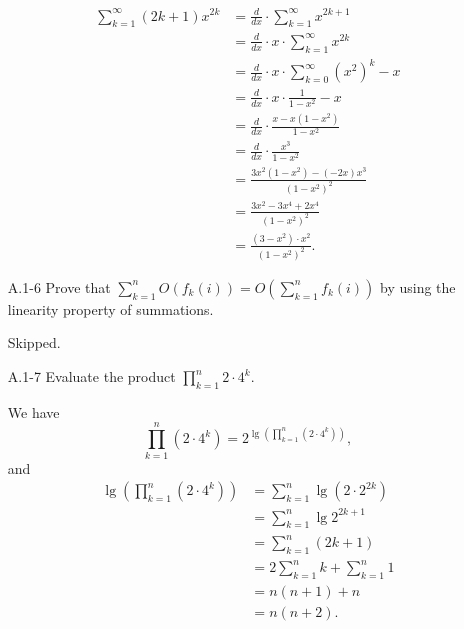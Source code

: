 \documentclass{report}
\makeatletter
\renewenvironment{framed}{%
 \def\FrameCommand##1{\hskip\@totalleftmargin
 \fboxsep=\FrameSep\fbox{##1}}%
 \MakeFramed {\advance\hsize-\width
   \@totalleftmargin\z@ \linewidth\hsize
   \@setminipage}}%
 {\par\unskip\endMakeFramed}
\makeatother
\begin{document}
\begin{enumerate}
\begin{framed}
\begin{equation*}
\begin{aligned}
  \sum_{k = 1}^{\infty} (2k + 1) x^{2k}
  &= \frac{d}{dx} \cdot \sum_{k = 1}^{\infty} x^{2k + 1}\\
  &= \frac{d}{dx} \cdot x \cdot \sum_{k = 1}^{\infty} x^{2k}\\
  &= \frac{d}{dx} \cdot x \cdot \sum_{k = 0}^{\infty} (x^2)^k - x\\
  &= \frac{d}{dx} \cdot x \cdot \frac{1}{1 - x^2} - x\\
  &= \frac{d}{dx} \cdot \frac{x - x (1 - x^2)}{1 - x^2}\\
  &= \frac{d}{dx} \cdot \frac{x^3}{1 - x^2}\\
  &= \frac{3 x^2 (1 - x^2) - (-2x) x^3}{(1 - x^2)^2}\\
  &= \frac{3 x^2 - 3 x^4 + 2 x^4}{(1 - x^2)^2}\\
  &= \frac{(3 - x^2) \cdot x^2}{(1 - x^2)^2}.
\end{aligned}
\end{equation*}
\end{framed}

\item[A.1{-}6] {Prove that
$\sum_{k=1}^{n} O(f_k(i)) = O(\sum_{k = 1}^{n} f_k(i))$ by using the linearity
property of summations.}

\begin{framed}
Skipped.
\end{framed}

\newpage

\item[A.1{-}7] {Evaluate the product $\prod_{k = 1}^{n} 2 \cdot 4^k$.}

\begin{framed}
We have
\[
  \prod_{k = 1}^n (2 \cdot 4^k) = 2^{\lg{\left(\prod_{k = 1}^n (2 \cdot 4^k)\right)}},
\]
and
\begin{equation*}
\begin{aligned}
  \lg{\left(\prod_{k = 1}^n (2 \cdot 4^k)\right)}
  &= \sum_{k = 1}^{n} \lg (2 \cdot 2^{2k})\\
  &= \sum_{k = 1}^{n} \lg 2^{2k + 1}\\
  &= \sum_{k = 1}^{n} (2k + 1)\\
  &= 2 \sum_{k = 1}^n k + \sum_{k = 1}^n 1\\
  &= n (n + 1) + n\\
  &= n (n + 2).
\end{aligned}
\end{equation*}


\end{framed}
\end{enumerate}
\end{document}
